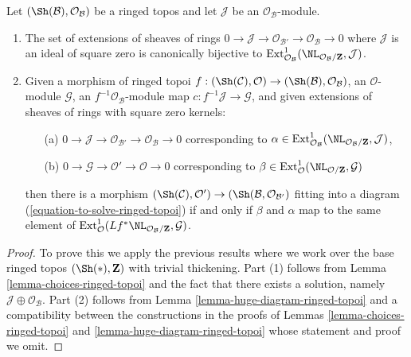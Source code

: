 \begin{lemma}
\label{lemma-extensions-of-ringed-topoi}
Let $(\Sh(\mathcal{B}), \mathcal{O}_\mathcal{B})$ be a ringed topos
and let $\mathcal{J}$ be an $\mathcal{O}_\mathcal{B}$-module.
\begin{enumerate}
\item The set of extensions of sheaves of rings
$0 \to \mathcal{J} \to \mathcal{O}_{\mathcal{B}'} \to
\mathcal{O}_\mathcal{B} \to 0$
where $\mathcal{J}$ is an ideal of square zero is canonically bijective to
$\text{Ext}^1_{\mathcal{O}_\mathcal{B}}(
\NL_{\mathcal{O}_\mathcal{B}/\mathbf{Z}}, \mathcal{J})$.
\item Given a morphism of ringed topoi
$f : (\Sh(\mathcal{C}), \mathcal{O}) \to
(\Sh(\mathcal{B}), \mathcal{O}_\mathcal{B})$, an $\mathcal{O}$-module
$\mathcal{G}$, an $f^{-1}\mathcal{O}_\mathcal{B}$-module map
$c : f^{-1}\mathcal{J} \to \mathcal{G}$, and
given extensions of sheaves of rings with square zero kernels:
\begin{enumerate}
\item[(a)] $0 \to \mathcal{J} \to \mathcal{O}_{\mathcal{B}'} \to
\mathcal{O}_\mathcal{B} \to 0$ corresponding to
$\alpha \in \text{Ext}^1_{\mathcal{O}_\mathcal{B}}(
\NL_{\mathcal{O}_\mathcal{B}/\mathbf{Z}}, \mathcal{J})$,
\item[(b)] $0 \to \mathcal{G} \to \mathcal{O}' \to \mathcal{O} \to 0$
corresponding to
$\beta \in \text{Ext}^1_\mathcal{O}(\NL_{\mathcal{O}/\mathbf{Z}}, \mathcal{G})$
\end{enumerate}
then there is a morphism $(\Sh(\mathcal{C}), \mathcal{O}') \to
(\Sh(\mathcal{B}, \mathcal{O}_{\mathcal{B}'})$ fitting into a diagram
(\ref{equation-to-solve-ringed-topoi}) if and only if $\beta$ and $\alpha$
map to the same element of
$\text{Ext}^1_\mathcal{O}(
Lf^*\NL_{\mathcal{O}_\mathcal{B}/\mathbf{Z}}, \mathcal{G})$.
\end{enumerate}
\end{lemma}

\begin{proof}
To prove this we apply the previous results where we work over
the base ringed topos $(\Sh(*), \mathbf{Z})$ with trivial thickening.
Part (1) follows from Lemma \ref{lemma-choices-ringed-topoi}
and the fact that there exists a solution, namely
$\mathcal{J} \oplus \mathcal{O}_\mathcal{B}$.
Part (2) follows from Lemma \ref{lemma-huge-diagram-ringed-topoi}
and a compatibility between the constructions in the proofs
of Lemmas \ref{lemma-choices-ringed-topoi} and
\ref{lemma-huge-diagram-ringed-topoi}
whose statement and proof we omit.
\end{proof}












